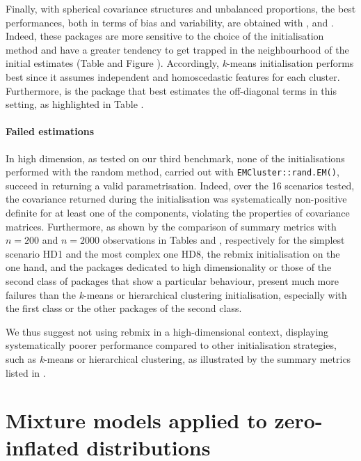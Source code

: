 Finally, with spherical covariance structures and unbalanced proportions, the best performances, both in terms of bias and variability, are obtained with ,  and . Indeed, these packages are more sensitive to the choice of the initialisation method and have a greater tendency to get trapped in the neighbourhood of the initial estimates (Table  and Figure ). Accordingly, \emph{k}-means initialisation performs best since it assumes independent and homoscedastic features for each cluster.
Furthermore,  is the package that best estimates the off-diagonal terms in this setting, as highlighted in Table .

\paragraph{Failed estimations}

In high dimension, as tested on our third benchmark, none of the initialisations performed with the random method, carried out with \texttt{EMCluster::rand.EM()}, succeed in returning a valid parametrisation. Indeed, over the 16 scenarios tested, the covariance returned during the initialisation was systematically non-positive definite for at least one of the components, violating the properties of covariance matrices. Furthermore, as shown by the comparison of summary metrics with \(n=200\) and \(n=2000\) observations in Tables 
and , respectively for the simplest scenario HD1 and the most complex one HD8, the rebmix initialisation on the one hand, and the packages dedicated to high dimensionality or those of the second class of packages that show a particular behaviour, present much more failures than the \emph{k}-means or hierarchical clustering initialisation, especially with the first class or the other packages of the second class.

We thus suggest not using rebmix in a high-dimensional context, displaying systematically poorer performance compared to other initialisation strategies, such as \emph{k}-means or hierarchical clustering, as illustrated by the summary metrics listed in .

\section{Mixture models applied to zero-inflated distributions}
\label{sec:truncated-distribution}


